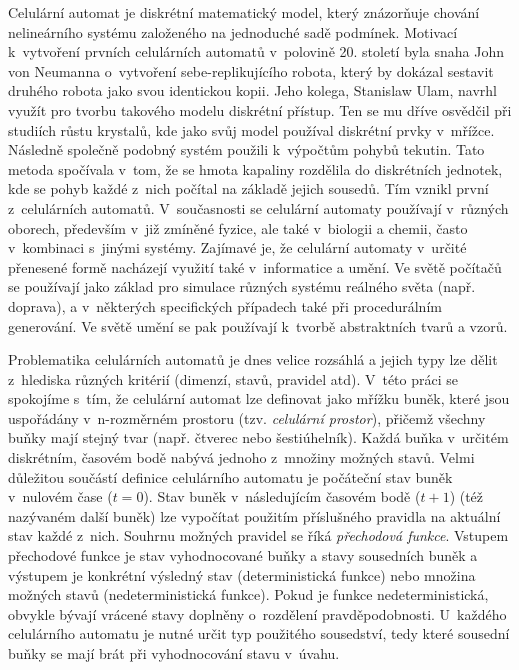 Celulární automat je diskrétní matematický model, který znázorňuje chování nelineárního systému založeného na jednoduché sadě podmínek.
Motivací k~vytvoření prvních celulárních automatů v~polovině 20. století byla snaha John von Neumanna o~vytvoření sebe-replikujícího robota, který by dokázal sestavit druhého robota jako svou identickou kopii.
Jeho kolega, Stanislaw Ulam, navrhl využít pro tvorbu takového modelu diskrétní přístup.
Ten se mu dříve osvědčil při studiích růstu krystalů, kde jako svůj model používal diskrétní prvky v~mřížce.
Následně společně podobný systém použili k~výpočtům pohybů tekutin.
Tato metoda spočívala v~tom, že se hmota kapaliny rozdělila do diskrétních jednotek, kde se pohyb každé z~nich počítal na základě jejich sousedů.
Tím vznikl první z~celulárních automatů.
V~současnosti se celulární automaty používají v~různých oborech, především v~již zmíněné fyzice, ale také v~biologii a chemii, často v~kombinaci s~jinými systémy.
Zajímavé je, že celulární automaty v~určité přenesené formě nacházejí využití také v~informatice a umění.
Ve světě počítačů se používají jako základ pro simulace různých systému reálného světa (např. doprava), a v~některých specifických případech také při procedurálním generování.
Ve světě umění se pak používají k~tvorbě abstraktních tvarů a vzorů.
\par
Problematika celulárních automatů je dnes velice rozsáhlá a jejich typy lze dělit z~hlediska různých kritérií (dimenzí, stavů, pravidel atd).
V~této práci se spokojíme s~tím, že celulární automat lze definovat jako mřížku buněk, které jsou uspořádány v~n-rozměrném prostoru (tzv. \textit{celulární prostor}), přičemž všechny buňky mají stejný tvar (např. čtverec nebo šestiúhelník). 
Každá buňka v~určitém diskrétním, časovém bodě nabývá jednoho z~množiny možných stavů.
Velmi důležitou součástí definice celulárního automatu je počáteční stav buněk v~nulovém čase ($t = 0$).
Stav buněk v~následujícím časovém bodě ($t + 1$) (též nazývaném další  buněk) lze vypočítat použitím příslušného pravidla na aktuální stav každé z~nich.
Souhrnu možných pravidel se říká \textit{přechodová funkce}.
Vstupem přechodové funkce je stav vyhodnocované buňky a stavy sousedních buněk a výstupem je konkrétní výsledný stav (deterministická funkce) nebo množina možných stavů (nedeterministická funkce).
Pokud je funkce nedeterministická, obvykle bývají vrácené stavy doplněny o~rozdělení pravděpodobnosti.
U~každého celulárního automatu je nutné určit typ použitého sousedství, tedy které sousední buňky se mají brát při vyhodnocování stavu v~úvahu\cite{lit:cellular_def}.
